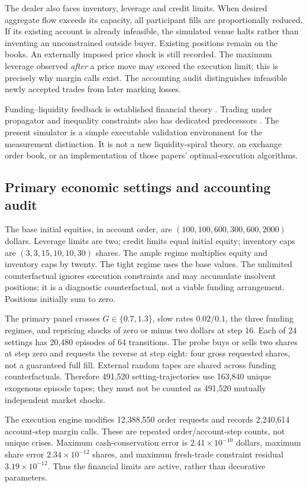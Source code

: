 \documentclass[11pt,a4paper]{article}
\theoremstyle{definition}
\theoremstyle{remark}
\begin{document}
The dealer also faces inventory, leverage and credit limits. When desired aggregate flow exceeds its capacity, all participant fills are proportionally reduced. If its existing account is already infeasible, the simulated venue halts rather than inventing an unconstrained outside buyer. Existing positions remain on the books. An externally imposed price shock is still recorded. The maximum leverage observed \emph{after} a price move may exceed the execution limit; this is precisely why margin calls exist. The accounting audit distinguishes infeasible newly accepted trades from later marking losses.

Funding--liquidity feedback is established financial theory \citep{brunnermeier2009}. Trading under propagator and inequality constraints also has dedicated predecessors \citep{abijaber2024}. The present simulator is a simple executable validation environment for the measurement distinction. It is not a new liquidity-spiral theory, an exchange order book, or an implementation of those papers' optimal-execution algorithms.

\subsection{Primary economic settings and accounting audit}
The base initial equities, in account order, are $(100,100,600,300,600,2000)$ dollars. Leverage limits are two; credit limits equal initial equity; inventory caps are $(3,3,15,10,10,30)$ shares. The ample regime multiplies equity and inventory caps by twenty. The tight regime uses the base values. The unlimited counterfactual ignores execution constraints and may accumulate insolvent positions; it is a diagnostic counterfactual, not a viable funding arrangement. Positions initially sum to zero.

The primary panel crosses $G\in\{0.7,1.3\}$, slow rates $0.02/0.1$, the three funding regimes, and repricing shocks of zero or minus two dollars at step 16. Each of 24 settings has 20,480 episodes of 64 transitions. The probe buys or sells two shares at step zero and requests the reverse at step eight: four gross requested shares, not a guaranteed full fill. External random tapes are shared across funding counterfactuals. Therefore 491,520 setting-trajectories use 163,840 unique exogenous episode tapes; they must not be counted as 491,520 mutually independent market shocks.

The execution engine modifies 12,388,550 order requests and records 2,240,614 account-step margin calls. These are repeated order/account-step counts, not unique crises. Maximum cash-conservation error is $2.41\times10^{-10}$ dollars, maximum share error $2.34\times10^{-12}$ shares, and maximum fresh-trade constraint residual $3.19\times10^{-12}$. Thus the financial limits are active, rather than decorative parameters.
\end{document}
